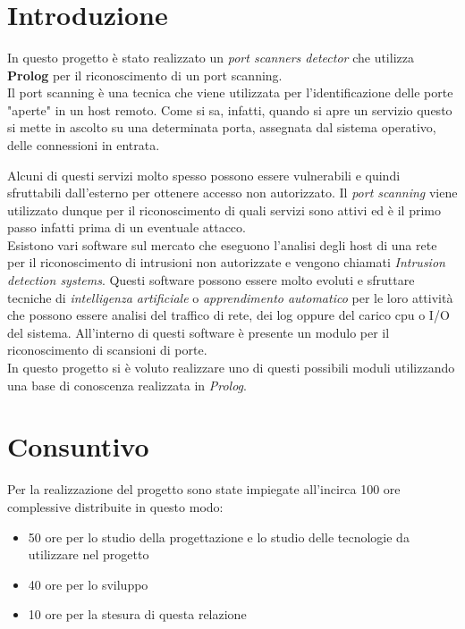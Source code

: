 \documentclass[a4paper,12pt]{article} %
\title{\bf \the\titolo}
\author{}
\date{\the\data}
\begin{document}


\newpage

\tableofcontents

\newpage

\section{Introduzione}

In questo progetto è stato realizzato un \emph{port scanners detector} che utilizza \textbf{Prolog} per il riconoscimento
di un port scanning.\\

Il port scanning è una tecnica che viene utilizzata per l'identificazione delle porte "aperte" in un host remoto.
Come si sa, infatti, quando si apre un servizio questo si mette in ascolto su una determinata porta, assegnata dal sistema 
operativo, delle connessioni in entrata.

Alcuni di questi servizi molto spesso possono essere vulnerabili e quindi sfruttabili dall'esterno per ottenere accesso
non autorizzato. Il \emph{port scanning} viene utilizzato dunque per il riconoscimento di quali servizi sono attivi ed
è il primo passo infatti prima di un eventuale attacco.\\


Esistono vari software sul mercato che eseguono l'analisi degli host di una rete per il riconoscimento di intrusioni 
non autorizzate e vengono chiamati \emph{Intrusion detection systems}. Questi software possono essere molto evoluti 
e sfruttare tecniche di \emph{intelligenza artificiale} o \emph{apprendimento automatico} per le loro attività che possono essere analisi del traffico di rete, dei log oppure del carico cpu o I/O del sistema. All'interno di questi software è 
presente un modulo per il riconoscimento di scansioni di porte. \\

In questo progetto si è voluto realizzare uno di questi possibili moduli utilizzando una base di conoscenza
realizzata in \emph{Prolog}.  



\section{Consuntivo}

Per la realizzazione del progetto sono state impiegate all'incirca 100 ore complessive distribuite in questo modo:

\begin{itemize}

\item 50 ore per lo studio della progettazione e lo studio delle tecnologie da utilizzare nel progetto
\item 40 ore per lo sviluppo 
\item 10 ore per la stesura di questa relazione


\end{itemize}
\end{document}
